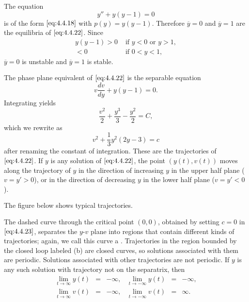 \documentclass{ximera}
\begin{document}
 
\begin{example}\label{example:4.4.3}
The equation
\begin{equation}\label{eq:4.4.22}
y''+y(y-1)=0
\end{equation}
is of the form $\eqref{eq:4.4.18}$ with $p(y)=y(y-1)$. Therefore $\overline{y}=0$ and $\overline{y}=1$ are the equilibria of $\eqref{eq:4.4.22}$. Since
\begin{eqnarray*}
y(y-1)>0 &\mbox{ if } y<0\mbox{ or }y>1,\\
<0&\mbox{ if } 0<y<1,
\end{eqnarray*}
$\overline{y}=0$ is unstable and $\overline{y}=1$ is
stable.
 
The phase plane equivalent of $\eqref{eq:4.4.22}$ is the separable equation
$$
v\frac{dv}{dy}+y(y-1)=0.
$$
Integrating yields
$$
\frac{v^2}{2}+\frac{y^3}{3}-\frac{y^2}{2}=C,
$$
which we rewrite  as
\begin{equation}\label{eq:4.4.23}
v^2+\frac{1}{3}y^2(2y-3)=c
\end{equation}
after renaming the constant of integration. These are the trajectories
of $\eqref{eq:4.4.22}$. If $y$ is any solution of $\eqref{eq:4.4.22}$,  the
point $(y(t),v(t))$ moves along the trajectory of $y$ in the direction
of increasing $y$ in the upper half plane ($v=y'>0$), or in the
direction of decreasing $y$ in the lower half plane ($v=y'<0$).
 
The figure below shows
typical trajectories.

\begin{center}
\end{center}

 
 
The
dashed curve through the critical point $(0,0)$, obtained by setting
$c=0$ in $\eqref{eq:4.4.23}$, separates the $y$-$v$ plane into regions
that contain different kinds of trajectories; again,
 we call this curve a .
Trajectories in the region bounded by the closed loop labeled (b) are closed
curves,
so solutions associated with them are periodic. Solutions associated
with other trajectories are not periodic. If $y$ is any such solution
with trajectory not  on the separatrix, then
$$
\begin{array}{llrllr}
\lim_{t\rightarrow\infty}y(t)&=&-\infty, &\lim_{t\rightarrow-\infty}y(t)&=&-\infty,\\
\lim_{t\rightarrow\infty}v(t)&=&-\infty,
&\lim_{t\rightarrow-\infty}v(t)&=&\infty.
\end{array}
$$
 

\end{example}
\end{document}
